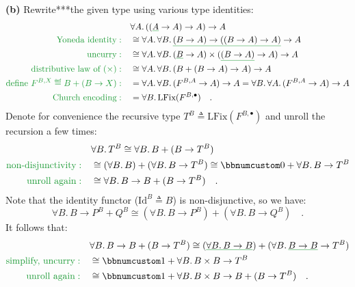 \textbf{(b)} Rewrite{*}{*}{*}the given type using various type identities:
\begin{align*}
 & \forall A.\,((\gunderline A\rightarrow A)\rightarrow A)\rightarrow A\\
{\color{greenunder}\text{Yoneda identity}:}\quad & \cong\forall A.\,\forall B.\,\gunderline{(B\rightarrow A)\rightarrow((B\rightarrow A)\rightarrow A)}\rightarrow A\\
{\color{greenunder}\text{uncurry}:}\quad & \cong\forall A.\,\forall B.\,(\gunderline B\rightarrow A)\times(\gunderline{(B\rightarrow A)}\rightarrow A)\rightarrow A\\
{\color{greenunder}\text{distributive law of }(\times):}\quad & \cong\forall A.\,\forall B.\,(B+(B\rightarrow A)\rightarrow A)\rightarrow A\\
{\color{greenunder}\text{define }F^{B,X}\triangleq B+(B\rightarrow X):}\quad & =\forall A.\,\forall B.\,(F^{B,A}\rightarrow A)\rightarrow A=\forall B.\,\forall A.\,(F^{B,A}\rightarrow A)\rightarrow A\\
{\color{greenunder}\text{Church encoding}:}\quad & =\forall B.\,\text{LFix}(F^{B,\bullet})\quad.
\end{align*}
Denote for convenience the recursive type $T^{B}\triangleq\text{LFix}(F^{B,\bullet})$
and unroll the recursion a few times:
\begin{align*}
 & \forall B.\,T^{B}\cong\forall B.\,B+(B\rightarrow T^{B})\\
{\color{greenunder}\text{non-disjunctivity}:}\quad & \cong(\forall B.\,B)+(\forall B.\,B\rightarrow T^{B})\cong\bbnum 0+\forall B.\,B\rightarrow T^{B}\\
{\color{greenunder}\text{unroll again}:}\quad & \cong\forall B.\,B\rightarrow B+(B\rightarrow T^{B})\quad.
\end{align*}
Note that the identity functor ($\text{Id}^{B}\triangleq B$) is non-disjunctive,
so we have:
\[
\forall B.\,B\rightarrow P^{B}+Q^{B}\cong(\forall B.\,B\rightarrow P^{B})+(\forall B.\,B\rightarrow Q^{B})\quad.
\]
It follows that:
\begin{align*}
 & \forall B.\,B\rightarrow B+(B\rightarrow T^{B})\cong(\gunderline{\forall B.\,B\rightarrow B})+(\forall B.\,\gunderline{B\rightarrow B}\rightarrow T^{B})\\
{\color{greenunder}\text{simplify, uncurry}:}\quad & \cong\bbnum 1+\forall B.\,B\times B\rightarrow T^{B}\\
{\color{greenunder}\text{unroll again}:}\quad & \cong\bbnum 1+\forall B.\,B\times B\rightarrow B+(B\rightarrow T^{B})\quad.
\end{align*}
